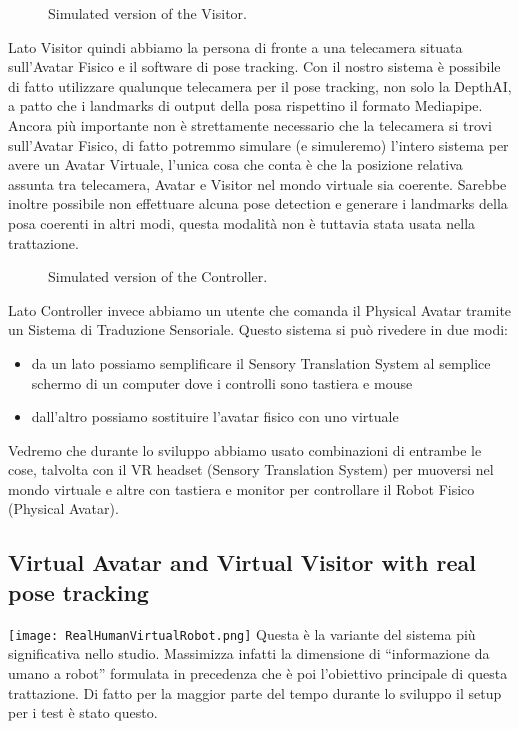 \documentclass{Configuration_Files/PoliMi3i_thesis}
\begin{document}
\begin{figure}[H]
    \centering
    \caption{Simulated version of the Visitor.}
    \label{fig:quadtree2_visitor}
\end{figure}

Lato Visitor quindi abbiamo la persona  di fronte a una telecamera situata sull'Avatar Fisico e il software di pose tracking. Con il nostro sistema è possibile di fatto utilizzare qualunque telecamera per il pose tracking, non solo la DepthAI, a patto che i landmarks di output della posa rispettino il formato Mediapipe.
Ancora più importante non è strettamente necessario che la telecamera si trovi sull'Avatar Fisico, di fatto potremmo simulare (e simuleremo) l'intero sistema per avere un Avatar Virtuale, l'unica cosa che conta è che la posizione relativa assunta tra telecamera, Avatar e Visitor nel mondo virtuale sia coerente.
Sarebbe inoltre possibile non effettuare alcuna pose detection e generare i landmarks della posa coerenti in altri modi, questa modalità non è tuttavia stata usata nella trattazione.


\begin{figure}[H]
    \centering
    \caption{Simulated version of the Controller.}
    \label{fig:quadtree2_controller}
\end{figure}
Lato Controller invece abbiamo un utente che comanda il Physical Avatar tramite un Sistema di Traduzione Sensoriale. Questo sistema si può rivedere in due modi:
\begin{itemize}
    \item da un lato possiamo semplificare il Sensory Translation System al semplice schermo di un computer dove i controlli sono tastiera e mouse
    \item dall'altro possiamo sostituire l'avatar fisico con uno virtuale
\end{itemize}
Vedremo che durante lo sviluppo abbiamo usato combinazioni di entrambe le cose, talvolta con il VR headset (Sensory Translation System) per muoversi nel mondo virtuale e altre con tastiera e monitor per controllare il Robot Fisico (Physical Avatar).

\subsection{Virtual Avatar and Virtual Visitor with real pose tracking}
\texttt{[image: RealHumanVirtualRobot.png]}
Questa è la variante del sistema più significativa nello studio. Massimizza infatti la dimensione di “informazione da umano a robot” formulata in precedenza che è poi l’obiettivo principale di questa trattazione. Di fatto per la maggior parte del tempo durante lo sviluppo il setup per i test è stato questo.
\end{document}
